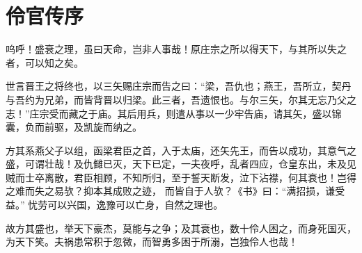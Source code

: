 \section{ 伶官传序}

呜呼！盛衰之理，虽曰天命，岂非人事哉！原庄宗之所以得天下，与其所以失之者，可以知之矣。

世言晋王之将终也，以三矢赐庄宗而告之曰：“梁，吾仇也；燕王，吾所立，契丹与吾约为兄弟，而皆背晋以归梁。此三者，吾遗恨也。与尔三矢，尔其无忘乃父之志！”庄宗受而藏之于庙。其后用兵，则遣从事以一少牢告庙，请其矢，盛以锦囊，负而前驱，及凯旋而纳之。

方其系燕父子以组，函梁君臣之首，入于太庙，还矢先王，而告以成功，其意气之盛，可谓壮哉！及仇雠已灭，天下已定，一夫夜呼，乱者四应，仓皇东出，未及见贼而士卒离散，君臣相顾，不知所归，至于誓天断发，泣下沾襟，何其衰也！岂得之难而失之易欤？抑本其成败之迹， 而皆自于人欤？《书》曰：“满招损，谦受益。” 忧劳可以兴国，逸豫可以亡身，自然之理也。

故方其盛也，举天下豪杰，莫能与之争；及其衰也，数十伶人困之，而身死国灭，为天下笑。夫祸患常积于忽微，而智勇多困于所溺，岂独伶人也哉！



